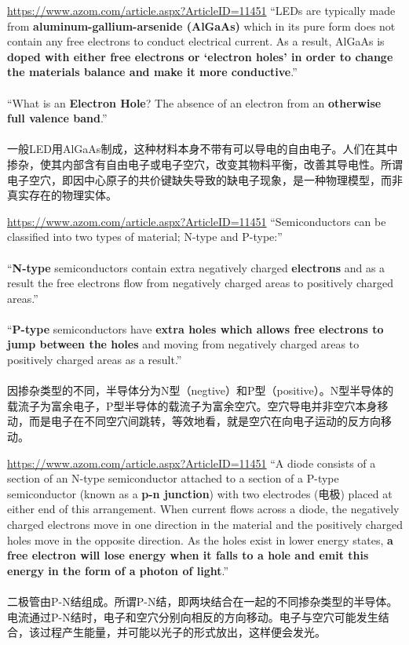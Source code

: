 \begin{slide}{\url{https://www.azom.com/article.aspx?ArticleID=11451}}
  ``LEDs are typically made from \textbf{aluminum-gallium-arsenide (AlGaAs)} which in its pure form does not contain any free electrons to conduct electrical current. As a result, AlGaAs is \textbf{doped with either free electrons or ‘electron holes’ in order to change the materials balance and make it more conductive}.''
  \\~\\
  ``What is an \textbf{Electron Hole}? The absence of an electron from an \textbf{otherwise full valence band}.''
  \\~\\
  一般LED用AlGaAs制成，这种材料本身不带有可以导电的自由电子。人们在其中掺杂，使其内部含有自由电子或电子空穴，改变其物料平衡，改善其导电性。所谓电子空穴，即因中心原子的共价键缺失导致的缺电子现象，是一种物理模型，而非真实存在的物理实体。
\end{slide}

\begin{slide}{\url{https://www.azom.com/article.aspx?ArticleID=11451}}
  ``Semiconductors can be classified into two types of material; N-type and P-type:''
  \\~\\
  ``\textbf{N-type} semiconductors contain extra negatively charged \textbf{electrons} and as a result the free electrons flow from negatively charged areas to positively charged areas.''
  \\~\\
  ``\textbf{P-type} semiconductors have \textbf{extra holes which allows free electrons to jump between the holes} and moving from negatively charged areas to positively charged areas as a result.''
  \\~\\
  因掺杂类型的不同，半导体分为N型（negtive）和P型（positive）。N型半导体的载流子为富余电子，P型半导体的载流子为富余空穴。空穴导电并非空穴本身移动，而是电子在不同空穴间跳转，等效地看，就是空穴在向电子运动的反方向移动。
\end{slide}

\begin{slide}{\url{https://www.azom.com/article.aspx?ArticleID=11451}}
  ``A diode consists of a section of an N-type semiconductor attached to a section of a P-type semiconductor (known as a \textbf{p-n junction}) with two electrodes (电极) placed at either end of this arrangement. When current flows across a diode, the negatively charged electrons move in one direction in the material and the positively charged holes move in the opposite direction. As the holes exist in lower energy states, \textbf{a free electron will lose energy when it falls to a hole and emit this energy in the form of a photon of light}.''
  \\~\\
  二极管由P-N结组成。所谓P-N结，即两块结合在一起的不同掺杂类型的半导体。电流通过P-N结时，电子和空穴分别向相反的方向移动。电子与空穴可能发生结合，该过程产生能量，并可能以光子的形式放出，这样便会发光。
\end{slide}

